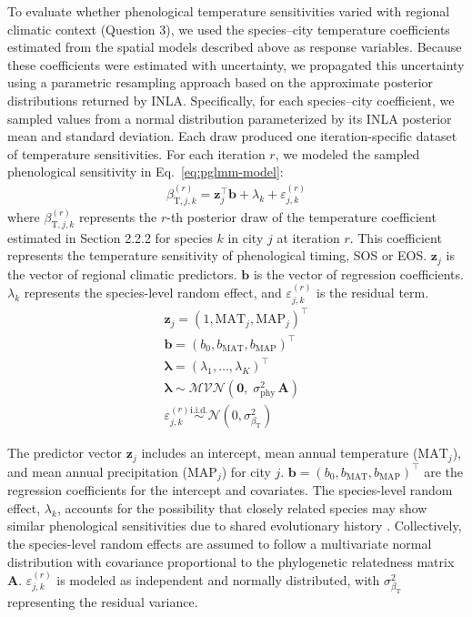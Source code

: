 To evaluate whether phenological temperature sensitivities varied with regional climatic context (Question 3), we used the species–city temperature coefficients estimated from the spatial models described above as response variables. Because these coefficients were estimated with uncertainty, we propagated this uncertainty using a parametric resampling approach based on the approximate posterior distributions returned by INLA. Specifically, for each species–city coefficient, we sampled values from a normal distribution parameterized by its INLA posterior mean and standard deviation. Each draw produced one iteration-specific dataset of temperature sensitivities.
For each iteration $r$, we modeled the sampled phenological sensitivity in Eq.~\ref{eq:pglmm-model}:
\begin{eqnarray}
    \beta_{{\text{T}},j,k}^{(r)} = \mathbf{z}_{j}^\top \boldsymbol{b} +\lambda_{k} + \varepsilon_{j,k}^{(r)}
    \label{eq:pglmm-model}
\end{eqnarray}
where $\beta_{{\text{T}},j,k}^{(r)}$ represents the $r$-th posterior draw of the temperature coefficient estimated in Section 2.2.2 for species $k$ in city $j$ at iteration $r$. This coefficient represents the temperature sensitivity of phenological timing, SOS or EOS. $\mathbf{z}_{j}$ is the vector of regional climatic predictors. $\boldsymbol{b}$ is the vector of regression coefficients. $\lambda_{k}$ represents the species-level random effect, and $\varepsilon_{j,k}^{(r)}$ is the residual term.
\begin{eqnarray}
    \mathbf{z}_{j} = (1, \mathrm{MAT}_{j}, \mathrm{MAP}_{j})^\top \\
    \boldsymbol{b} = (b_0,b_{\mathrm{MAT}},b_{\mathrm{MAP}})^\top \\
    \boldsymbol{\lambda} = (\lambda_1, \dots, \lambda_K)^\top \\
    \boldsymbol{\lambda} \sim \mathcal{MVN}\!\left(\mathbf{0},\; \sigma^2_{\mathrm{phy}}\,\mathbf{A}\right) \\
    \varepsilon_{j,k}^{(r)} \stackrel{\text{i.i.d.}}{\sim} \mathcal{N}(0,\sigma^2_{\beta_\text{T}})
\end{eqnarray}

The predictor vector $\mathbf{z}_{j}$ includes an intercept, mean annual temperature ($\mathrm{MAT}_{j}$), and mean annual precipitation ($\mathrm{MAP}_{j}$) for city $j$. $\boldsymbol{b}= (b_0, b_{\mathrm{MAT}},b_{\mathrm{MAP}})^\top$ are the regression coefficients for the intercept and covariates. The species-level random effect, $\lambda_k$, accounts for the possibility that closely related species may show similar phenological sensitivities due to shared evolutionary history \citep{Li2020MEE,Losos1996Ecology}. Collectively, the species-level random effects are assumed to follow a multivariate normal distribution with covariance proportional to the phylogenetic relatedness matrix $\mathbf{A}$. $\varepsilon_{j,k}^{(r)}$ is modeled as independent and normally distributed, with $\sigma^2_{\beta_\text{T}}$ representing the residual variance.

